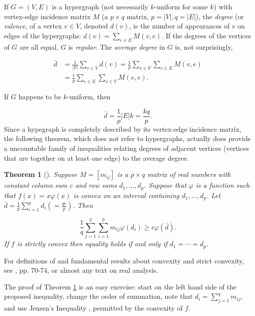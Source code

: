 \documentclass[final,1p,times]{elsarticle}
\newtheorem{thm}{Theorem}[section]
\begin{document}
If $G = (V, E)$ is a hypergraph (not necessarily $k$-uniform for some $k$) with vertex-edge incidence matrix $M$  (a $p \times q$ matrix, $p = |V|, q = |E|$), the {\em degree} (or {\em valence}, of a vertex $v \in V$, denoted $d(v)$, is the number of appearances of $v$ on edges of the hypergraphs: $d(v) = \sum _{e \in E} M(v, e)$. If the degrees of the vertices of $G$ are all equal, $G$ is {\em regular}.  The {\em average degree} in $G$ is, not surprisingly, 

$$\begin{array}{ll}
\bar {d} & = \frac {1}{|V|} \sum _{v \in V} d(v) = \frac {1}{p} \sum _{v \in V} \sum _{e \in E} M(v, e)\\ [.2in]
& = \frac {1}{p} \sum _{e \in E} \sum _{v \in V} M(v, e).
\end{array}$$

If $G$ happens to be $k$-uniform, then

$$
\bar {d} = \frac {1}{p} |E| k = \frac {kq}{p}.
$$
Since a hypegraph is completely described by its vertex-edge incidence matrix, the following theorem, which does not refer to hypergraphs, actually does provide a uncountable family of inequalities relating degrees of adjacent vertices (vertices that are together on at least one edge) to the average degree.

\begin{thm} [\cite {JP}]  \label {t1}
Suppose $M = [m_{ij}]$ is a $p \times q$ matrix of real numbers with constant column sum $c$ and row sums $d_1, \dots, d_p$.  Suppose that $\varphi$ is a function such that $f(x) = x \varphi (x)$ is convex on an interval containing $d_1, \dots, d_p$.
Let $\bar {d} = \frac {1}{p} \sum _{i=1}^p d_i (= \frac {qc}{p})$.  Then 

$$
\frac {1}{q} \sum _{j=1}^q \sum _{i=1}^p m_{ij} \varphi (d_i) \geq c \varphi (\bar {d}).
$$
If $f$ is strictly convex then equality holds if and only if $d_1 = \cdots = d_p$.
\end{thm}

For definitions of and fundamental results about convexity and strict convexity, see \cite {HL}, pp. 70-74, or almost any text on real analysis.

The proof of Theorem \ref {t1} is an easy exercise:  start on the left hand side of the proposed inequality, change the order of summation, note that $d_i = \sum _{j=1}^q m_{ij}$, and use Jensen's Inequality \cite {HL}, permitted by the convexity of $f$.  
\end{document}
